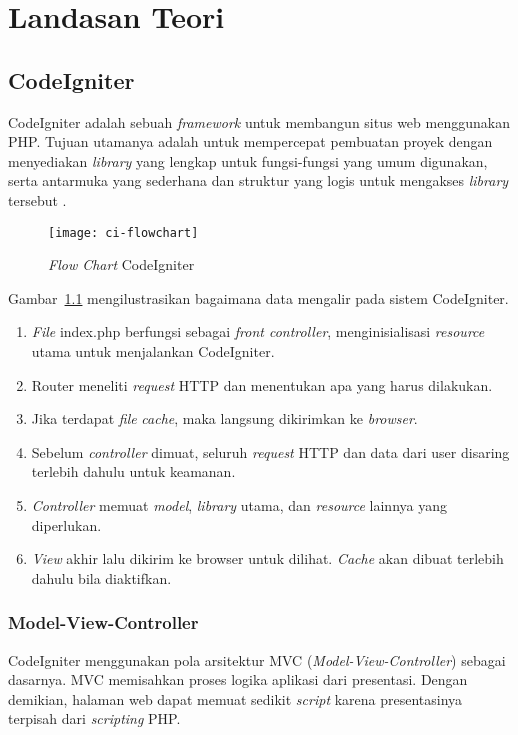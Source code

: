 \chapter{Landasan Teori}
\label{chap:teori}

\section{CodeIgniter}
\label{sec:codeigniter} 

CodeIgniter adalah sebuah \textit{framework} untuk membangun situs web menggunakan PHP. Tujuan utamanya adalah untuk mempercepat pembuatan proyek dengan menyediakan \textit{library} yang lengkap untuk fungsi-fungsi yang umum digunakan, serta antarmuka yang sederhana dan struktur yang logis untuk mengakses \textit{library} tersebut \cite{codeigniter}.

\begin{figure}[H]
	\centering  
	\texttt{[image: ci-flowchart]}  
	\caption[\textit{Flow Chart} CodeIgniter]{\textit{Flow Chart} CodeIgniter} 
	\label{fig:ciflowchart} 
\end{figure} 

Gambar~\ref{fig:ciflowchart} mengilustrasikan bagaimana data mengalir pada sistem CodeIgniter.

\begin{enumerate}
	\item \textit{File} index.php berfungsi sebagai \textit{front controller}, menginisialisasi \textit{resource} utama untuk menjalankan CodeIgniter.
	\item Router meneliti \textit{request} HTTP dan menentukan apa yang harus dilakukan.
	\item Jika terdapat \textit{file} \textit{cache}, maka langsung dikirimkan ke \textit{browser}.
	\item Sebelum \textit{controller} dimuat, seluruh \textit{request} HTTP dan data dari user disaring terlebih dahulu untuk keamanan.
	\item \textit{Controller} memuat \textit{model}, \textit{library} utama, dan  \textit{resource} lainnya yang diperlukan.
	\item \textit{View} akhir lalu dikirim ke browser untuk dilihat. \textit{Cache} akan dibuat terlebih dahulu bila diaktifkan. 
\end{enumerate}

\subsection{Model-View-Controller}
\label{subs:cimvc} 
CodeIgniter menggunakan pola arsitektur MVC (\textit{Model-View-Controller}) sebagai dasarnya. MVC memisahkan proses logika aplikasi dari presentasi. Dengan demikian, halaman web dapat memuat sedikit \textit{script} karena presentasinya terpisah dari \textit{scripting} PHP.

